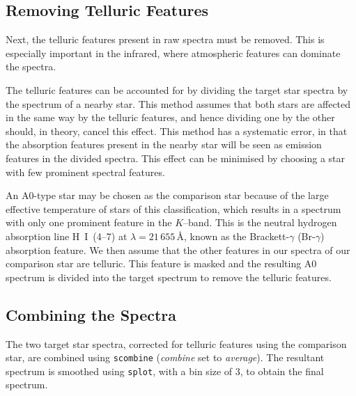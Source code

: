 
\subsection{Removing Telluric Features}
\label{cha:InfraredDataReductionTechniques:sec:SpectroscopyData:subsec:TelluricFeatures}

Next, the telluric
features present in raw spectra must be removed. This is especially
important in the infrared, where atmospheric features can dominate the
spectra. %

\vspace{\myparskip}

The telluric features can be accounted for by dividing the
target star spectra by the spectrum of a nearby star. This method assumes that both stars are affected in the same way by the telluric features, and hence dividing one by the other should, in theory, cancel this effect. This method has a
systematic error, in that the absorption features present in the nearby
star will be seen as emission features in the divided spectra. This
effect can be minimised by choosing a star with few prominent spectral
features. %

\vspace{\myparskip}

An A0-type star may be chosen as the comparison star because of the
large effective temperature of stars of this classification, which
results in a spectrum with only one prominent feature in the
$K$--band.  This is the neutral hydrogen absorption line \mbox{H I
(4--7)} at $\lambda=21\,655$\,\AA, known as the Brackett-$\gamma$
(Br-$\gamma$) absorption feature. We then assume that the other
features in our spectra of our comparison star are telluric. This feature is masked and the resulting A0 spectrum is divided into the target spectrum to remove the telluric features. %


\subsection{Combining the Spectra}
\label{cha:InfraredDataReductionTechniques:sec:SpectroscopyData:subsec:CombiningTheSpectra}

The two target star spectra, corrected for telluric features using the comparison
star, are combined using \texttt{scombine} (\textit{combine} set to
\textit{average}). The resultant spectrum is smoothed using
\texttt{splot}, with a bin size of 3, to obtain the final spectrum. %

